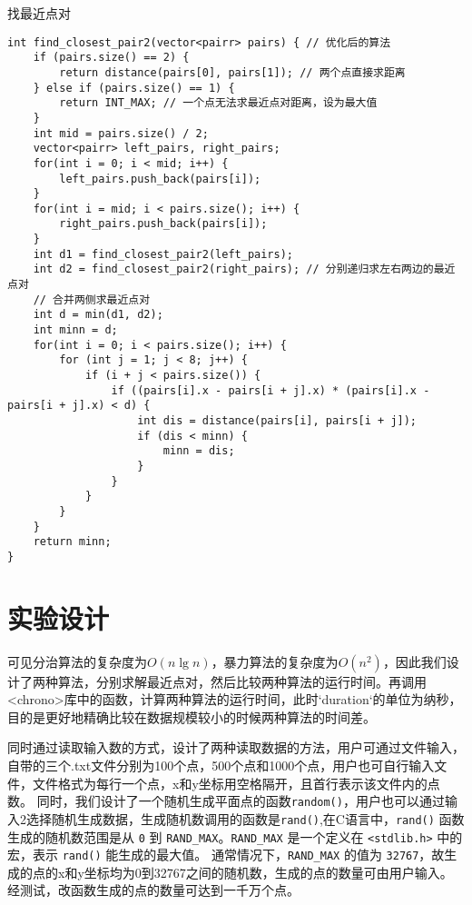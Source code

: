 \documentclass[a4paper,9pt]{article}
\begin{document}
\begin{listing}[H]
	\caption{找最近点对}
	\label{code:2}
	\begin{verbatim} 
int find_closest_pair2(vector<pairr> pairs) { // 优化后的算法
    if (pairs.size() == 2) {
        return distance(pairs[0], pairs[1]); // 两个点直接求距离
    } else if (pairs.size() == 1) {
        return INT_MAX; // 一个点无法求最近点对距离，设为最大值
    }
    int mid = pairs.size() / 2;
    vector<pairr> left_pairs, right_pairs;
    for(int i = 0; i < mid; i++) {
        left_pairs.push_back(pairs[i]);
    }
    for(int i = mid; i < pairs.size(); i++) {
        right_pairs.push_back(pairs[i]);
    }
    int d1 = find_closest_pair2(left_pairs);
    int d2 = find_closest_pair2(right_pairs); // 分别递归求左右两边的最近点对
    // 合并两侧求最近点对
    int d = min(d1, d2);
    int minn = d;
    for(int i = 0; i < pairs.size(); i++) {
        for (int j = 1; j < 8; j++) {
            if (i + j < pairs.size()) {
                if ((pairs[i].x - pairs[i + j].x) * (pairs[i].x - pairs[i + j].x) < d) {
                    int dis = distance(pairs[i], pairs[i + j]);
                    if (dis < minn) {
                        minn = dis;
                    }
                }
            }
        }
    }
    return minn;
}
\end{verbatim}
\end{listing}

    
\section{实验设计}
可见分治算法的复杂度为$O(n\lg n)$，暴力算法的复杂度为$O(n^2)$，因此我们设计了两种算法，分别求解最近点对，然后比较两种算法的运行时间。再调用<chrono>库中的函数，计算两种算法的运行时间，此时`duration`的单位为纳秒，目的是更好地精确比较在数据规模较小的时候两种算法的时间差。

同时通过读取输入数的方式，设计了两种读取数据的方法，用户可通过文件输入，自带的三个.txt文件分别为100个点，500个点和1000个点，用户也可自行输入文件，文件格式为每行一个点，x和y坐标用空格隔开，且首行表示该文件内的点数。
同时，我们设计了一个随机生成平面点的函数\verb|random()|，用户也可以通过输入2选择随机生成数据，生成随机数调用的函数是\verb|rand()|,在C语言中，\verb|rand()| 函数生成的随机数范围是从 \verb|0| 到 \verb|RAND_MAX|。\verb|RAND_MAX| 是一个定义在 \verb|<stdlib.h>| 中的宏，表示 \verb|rand()| 能生成的最大值。
通常情况下，\verb|RAND_MAX| 的值为 \verb|32767|，故生成的点的x和y坐标均为0到32767之间的随机数，生成的点的数量可由用户输入。经测试，改函数生成的点的数量可达到一千万个点。
\end{document}
